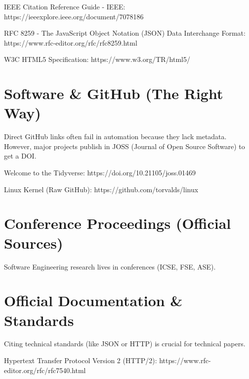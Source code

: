 \documentclass[12pt]{article}
\begin{document}
IEEE Citation Reference Guide - IEEE:
https://ieeexplore.ieee.org/document/7078186

RFC 8259 - The JavaScript Object Notation (JSON) Data Interchange Format:
https://www.rfc-editor.org/rfc/rfc8259.html

 W3C HTML5 Specification:
https://www.w3.org/TR/html5/

\section{Software & GitHub (The Right Way)}
Direct GitHub links often fail in automation because they lack metadata. 
However, major projects publish in JOSS (Journal of Open Source Software) to get a DOI.

 Welcome to the Tidyverse:
https://doi.org/10.21105/joss.01469

 Linux Kernel (Raw GitHub):
https://github.com/torvalds/linux

\section{Conference Proceedings (Official Sources)}
Software Engineering research lives in conferences (ICSE, FSE, ASE).

\section{Official Documentation & Standards}
Citing technical standards (like JSON or HTTP) is crucial for technical papers.

Hypertext Transfer Protocol Version 2 (HTTP/2):
https://www.rfc-editor.org/rfc/rfc7540.html
\end{document}
